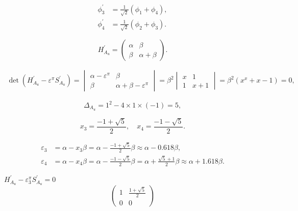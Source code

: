 \documentclass[a4paper]{book}
\newcommand{\Hp}{H^\prime}
\newcommand{\Sp}{S^\prime}
\begin{document}
\begin{solution}
\begin{enumerate}[label=(\alph*)]
		\begin{align*}
		\phi^\prime_3 &= \frac{1}{\sqrt{2}} (\phi_1+\phi_4) , \\
		\phi^\prime_4 &= \frac{1}{\sqrt{2}} (\phi_2+\phi_3) .
		\end{align*}
		
		\begin{equation*}
			\Hp_{A_u} = \begin{pmatrix}
				\alpha	&	\beta \\ \beta & \alpha + \beta 
			\end{pmatrix}.
		\end{equation*}
		
		\begin{align*}
			\det(\Hp_{A_u}-\varepsilon^\pi \Sp_{A_u}) = \begin{vmatrix}	
			\alpha-\varepsilon^\pi	&	\beta \\ 
			\beta & \alpha + \beta -\varepsilon^\pi	
\end{vmatrix} = \beta^2
\begin{vmatrix}
			x & 1 \\ 1 & x +1			
			\end{vmatrix} = \beta^2 ( x^x + x - 1 ) = 0,
		\end{align*}
		
		\begin{equation*}
			\Delta_{A_u} = 1^2 - 4 \times 1 \times (-1) = 5,
		\end{equation*}		
		
		\begin{equation*}
			x_3 = \frac{-1+\sqrt{5}}{2}, \quad x_4 = \frac{-1-\sqrt{5}}{2}.
		\end{equation*}
		
		\begin{align*}
			\varepsilon_3 &= \alpha - x_3 \beta = \alpha - \frac{-1+\sqrt{5}}{2} \beta \approx \alpha - 0.618 \beta , \\
			\varepsilon_4 &= \alpha - x_4 \beta = \alpha - \frac{-1-\sqrt{5}}{2} \beta = \alpha + \frac{\sqrt{5}+1}{2} \beta \approx \alpha + 1.618 \beta .
		\end{align*}
		
		$\Hp_{A_u}-\varepsilon^\pi_3 \Sp_{A_u} = 0$
		\begin{equation*}
			\begin{pmatrix}
				1	& \frac{1+\sqrt{5}}{2}	\\	0	&	0
			\end{pmatrix}
		\end{equation*}		
		

\end{enumerate}
\end{solution}
\end{document}
